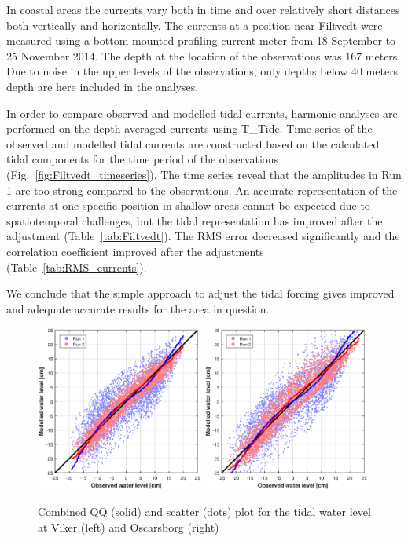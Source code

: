 In coastal areas the currents vary both in time and over relatively short distances both vertically and horizontally. The currents at a position near Filtvedt were measured using a bottom-mounted profiling current meter from 18 September to 25 November 2014. The depth at the location of the observations was 167 meters. Due to noise in the upper levels of the observations, only depths below 40 meters depth are here included in the analyses. 

In order to compare observed and modelled tidal currents, harmonic analyses are performed on the depth averaged currents using T\_Tide.
Time series of the observed and modelled tidal currents are constructed based on the calculated tidal components for the time period of the observations (Fig.~\ref{fig:Filtvedt_timeseries}). The time series reveal that the amplitudes in Run 1 are too strong compared to the observations. 
An accurate representation of the currents at one specific position in shallow areas cannot be expected due to spatiotemporal challenges, but the tidal representation has improved after the adjustment (Table~\ref{tab:Filtvedt}). The RMS error decreased significantly and the correlation coefficient improved after the adjustments (Table~\ref{tab:RMS_currents}).

We conclude that the simple approach to adjust the tidal forcing gives improved and adequate accurate results for the area in question.


\begin{figure}[!t]
\centering
\includegraphics[width=0.49\textwidth]{fig_Viker_QQ_Scatter}
\includegraphics[width=0.49\textwidth]{fig_Oscarsborg_QQ_Scatter}
\caption{Combined QQ (solid) and scatter (dots) plot for the tidal water level at Viker (left) and Oscarsborg (right)}
\label{fig:Oslo_QQ_Scatter}
\end{figure}

